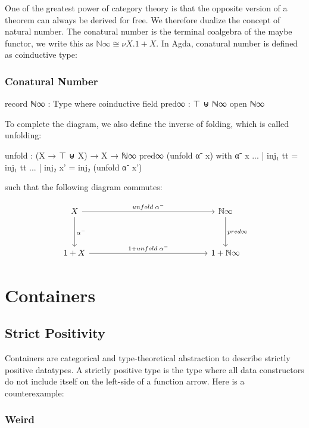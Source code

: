 {One of the greatest power of category theory is that the opposite version of a theorem can always be derived for free. We therefore dualize the concept of natural number. The conatural number is the terminal coalgebra of the maybe functor, we write this as $\mathbb{N}\infty \cong \nu X. 1 + X$. In Agda, conatural number is defined as coinductive type:

\subsubsection*{Conatural Number}

\begin{code}
record ℕ∞ : Type where
  coinductive
  field
    pred∞ : ⊤ ⊎ ℕ∞
open ℕ∞
\end{code}

To complete the diagram, we also define the inverse of folding, which is called unfolding:

\begin{code}
unfold : (X → ⊤ ⊎ X) → X → ℕ∞
pred∞ (unfold α⁻ x) with α⁻ x 
... | inj₁ tt = inj₁ tt
... | inj₂ x' = inj₂ (unfold α⁻ x')
\end{code}

such that the following diagram commutes:

\[
\begin{tikzcd}[row sep=huge, column sep=5.0cm]
X \arrow[r, "unfold\;\alpha^{-}"] \arrow[d, "\alpha^{-}"]
& \mathbb{N}\infty \arrow[d, "pred\infty"] \\
1 + X \arrow[r, "1 + unfold\;\alpha^{-}"]
& 1 + \mathbb{N}\infty
\end{tikzcd}
\]

\section{Containers}

\subsection{Strict Positivity}

Containers are categorical and type-theoretical abstraction to describe strictly positive datatypes. A strictly positive type is the type where all data constructors do not include itself on the left-side of a function arrow. Here is a counterexample:

\subsubsection*{Weird}

}

